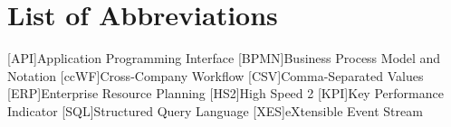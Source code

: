 \chapter*{List of Abbreviations}

\begin{acronym}[BPMN] %

	[API]{Application Programming Interface}
	[BPMN]{Business Process Model and Notation}
	[ccWF]{Cross-Company Workflow}
	[CSV]{Comma-Separated Values}
	[ERP]{Enterprise Resource Planning}
	[HS2]{High Speed 2}
	[KPI]{Key Performance Indicator}
	[SQL]{Structured Query Language}
	[XES]{eXtensible Event Stream}

\end{acronym}